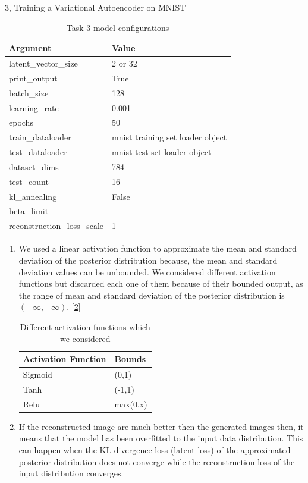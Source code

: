 \documentclass[10pt,a4paper]{article}
\begin{document}
\begin{task}{3, Training a Variational Autoencoder on MNIST}
\begin {table}[H]
\caption {Task 3 model configurations} \label{tab:configs_options_task3} 
\begin{center}
\begin{tabular}{ | m{10em} | m{20em}| } 
\hline
Argument & Value \\ 
\hline \hline
latent\_vector\_size & 2 or 32 \\ 
\hline
print\_output & True \\
\hline
batch\_size & 128\\
\hline
learning\_rate & 0.001 \\
\hline
epochs & 50 \\
\hline
train\_dataloader & mnist training set loader object \\
\hline
test\_dataloader & mnist test set loader object  \\
\hline
dataset\_dims & 784 \\
\hline
test\_count & 16 \\
\hline
kl\_annealing & False \\
\hline
beta\_limit & - \\
\hline
reconstruction\_loss\_scale & 1 \\
\hline
\end{tabular}
\end{center}
\end{table}

\begin{enumerate}
	\item We used a linear activation function to approximate the mean and standard deviation of the posterior distribution because, the mean and standard deviation values can be unbounded. We considered different activation functions but discarded each one of them because of their bounded output, as the range of mean and standard deviation of the posterior distribution is $(-\infty, +\infty)$. [\ref{tab:activation}]
\begin {table}[H]
\caption {Different activation functions which we considered} \label{tab:activation} 
\begin{center}
\begin{tabular}{ | m{10em} | m{10em}| } 
\hline
Activation Function& Bounds \\ 
\hline \hline
Sigmoid & (0,1) \\ 
\hline
Tanh & (-1,1) \\
\hline
Relu & max(0,x) \\
\hline
\end{tabular}
\end{center}
\end{table}
	\item If the reconstructed image are much better then the generated images then, it means that the model has been overfitted to the input data distribution. This can happen when the KL-divergence loss (latent loss) of the approximated posterior distribution does not converge while the reconstruction loss of the input distribution converges. 
	

\end{enumerate}
\end{task}
\end{document}

